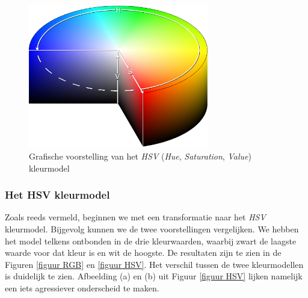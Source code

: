 \documentclass[a4paper,kulak]{kulakarticle}
\begin{document}
\begin{figure}[H]
	\centering
	\includegraphics[width=0.7\textwidth]{HSV_vb.png}
	
	\caption{Grafische voorstelling van het \textit{HSV} (\textit{Hue}, \textit{Saturation}, \textit{Value}) kleurmodel}
	\label{figuur hsv_schema}
\end{figure}

\subsubsection{Het HSV kleurmodel}
Zoals reeds vermeld, beginnen we met een transformatie naar het \textit{HSV} kleurmodel. Bijgevolg kunnen we de twee voorstellingen vergelijken. We hebben het model telkens ontbonden in de drie kleurwaarden, waarbij zwart de laagste waarde voor dat kleur is en wit de hoogste. De resultaten zijn te zien in de Figuren \ref{figuur RGB} en \ref{figuur HSV}. Het verschil tussen de twee kleurmodellen is duidelijk te zien. Afbeelding (a) en (b) uit Figuur \ref{figuur HSV} lijken namelijk een iets agressiever onderscheid te maken.
\end{document}
